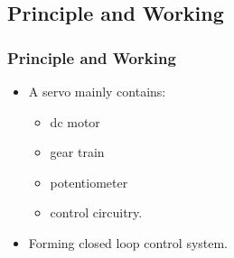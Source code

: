 \documentclass[table,10pt,red]{beamer}	%
\begin{document}
\subsection{Principle and Working}
\begin{frame}
	\frametitle{Principle and Working}
	\begin{itemize}
		\item
		A servo mainly contains:


		\begin{itemize}
			\pause
			\item
			dc motor
			\pause
			\item
			gear train
			\pause
			\item
			potentiometer
			\pause
			\item
			control circuitry.\\
			\pause
		\end{itemize}


		\item
		Forming closed loop control system.\\
	\end{itemize}
\end{frame}
	

\end{document}
